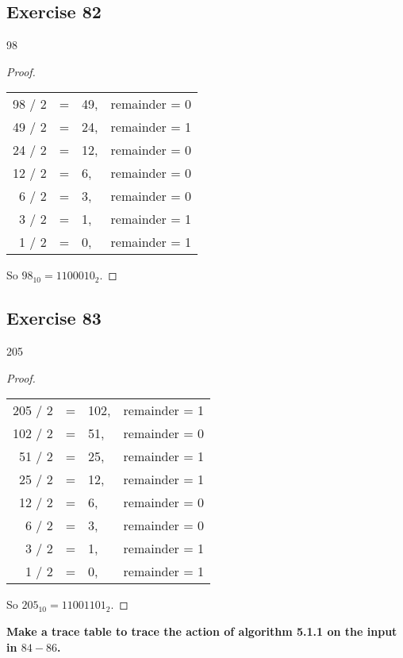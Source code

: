 \documentclass[14pt]{extarticle}
\newcommand{\cy}{\color{cyan}}
\begin{document}
\subsection{Exercise 82}
98
\begin{proof}
    \begin{center}
        \begin{tabular}{rcll}
            98 / 2 & = & 49, & remainder = 0 \\
            49 / 2 & = & 24, & remainder = 1 \\
            24 / 2 & = & 12, & remainder = 0 \\
            12 / 2 & = & 6,  & remainder = 0 \\
            6 / 2  & = & 3,  & remainder = 0 \\
            3 / 2  & = & 1,  & remainder = 1 \\
            1 / 2  & = & 0,  & remainder = 1
        \end{tabular}
    \end{center}
    So $98_{10} = 1100010_2$.
\end{proof}

\subsection{Exercise 83}
205
\begin{proof}
    \begin{center}
        \begin{tabular}{rcll}
            205 / 2 & = & 102, & remainder = 1 \\
            102 / 2 & = & 51,  & remainder = 0 \\
            51 / 2  & = & 25,  & remainder = 1 \\
            25 / 2  & = & 12,  & remainder = 1 \\
            12 / 2  & = & 6,   & remainder = 0 \\
            6 / 2   & = & 3,   & remainder = 0 \\
            3 / 2   & = & 1,   & remainder = 1 \\
            1 / 2   & = & 0,   & remainder = 1
        \end{tabular}
    \end{center}
    So $205_{10} = 11001101_2$.
\end{proof}

{\bf\cy Make a trace table to trace the action of algorithm 5.1.1 on the input in $84-86$.}
\end{document}
